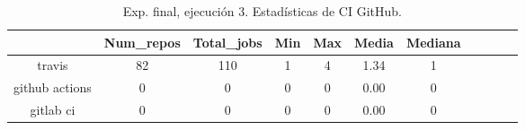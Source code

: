 \begin{table}[h]
  \centering
  \caption{Exp. final, ejecución 3. Estadísticas de CI GitHub.}
  \label{tab:tabla_f3_3}

\begin{footnotesize}
\renewcommand{\arraystretch}{1.5} %
\begin{tabular}{ccccccccccc}
  \hline
  {} &  Num\_repos &  Total\_jobs &  Min &  Max &  Media &  Mediana \\
  \hline
  travis         &         82 &         110 &    1 &    4 &   1.34 &        1 \\
  github actions &          0 &           0 &    0 &    0 &   0.00 &        0 \\
  gitlab ci      &          0 &           0 &    0 &    0 &   0.00 &        0 \\
 \end{tabular}
\end{footnotesize}

\end{table}

